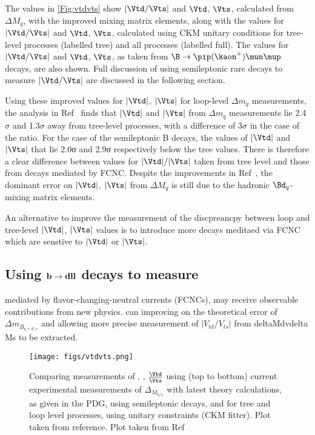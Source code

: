 The values in \autoref{Fig:vtdvts} show $|\Vtd/\Vts|$ and $\Vtd$, $\Vts$, calculated from $\Delta M_{q}$, with the improved mixing matrix elements, along with the values for $|\Vtd/\Vts|$ and $\Vtd$, $\Vts$, calculated using CKM unitary conditions for tree-level processes (labelled tree) and all processes (labelled full). The values for $|\Vtd/\Vts|$ and $\Vtd$, $\Vts$, as taken from $\B\to\pip(\kaon^{+})\mun\mup$ decays, are also shown. Full discussion of using semileptonic rare decays to measure $|\Vtd/\Vts|$ are discussed in the following section.    %

Using these improved values for $|\Vtd|$, $|\Vts|$ for loop-level $\Delta m_{q}$ measurements, the analysis in Ref~\cite{vtdvts} finds that $|\Vtd|$ and $|\Vts|$ from $\Delta m_{q}$ measurements lie 2.4$\sigma$ and 1.3$\sigma$ away from tree-level processes, with a difference of 3$\sigma$ in the case of the ratio. For the case of the semileptonic B decays, the values of $|\Vtd|$ and $|\Vts|$ that lie  2.0σ and 2.9σ respectively below the tree values. 
There is therefore a clear difference between values for $|\Vtd|/|\Vts|$ taken from tree level and those from decays mediated by FCNC. Despite the improvements in Ref~\cite{vtdvts}, the dominant error on $|\Vtd|$, $|\Vts|$ from $\Delta M_{q}$ is still due to the hadronic $\Bd_{q}$-mixing matrix elements.

An alternative to improve the measurement of the discpreancpy between loop and tree-level $|\Vtd|$, $|\Vts|$ values is to introduce more decays meditaed via FCNC which are senstive to $|\Vtd|$ or $|\Vts|$.

\subsection{Using $\bf{b\to dll}$ decays to measure }

mediated by flavor-changing-neutral currents (FCNCs), may receive observable contributions
from new physics.
can improving on the
theoretical error of $\Delta m_{B_{q = d,s}}$ and allowing more precise measurement of $|V_{td}/V_{ts}|$ from deltaMdvdelta Ms to be extracted.

\begin{figure}
\texttt{[image: figs/vtdvts.png]}
\caption{Comparing measurements of \Vtd, \Vts, $\frac{\Vtd}{\Vts}$ using (top to bottom) current experimental measurements of $\Delta_{M_{b/s}}$ with latest theory calculations, as given in the PDG,  using semileptonic decays, and for tree and loop level processes, using unitary constraints (CKM fitter). Plot taken from reference. Plot taken from Ref~\cite{vtdvts}}
\label{Fig:vtdvts}
\end{figure}
 
